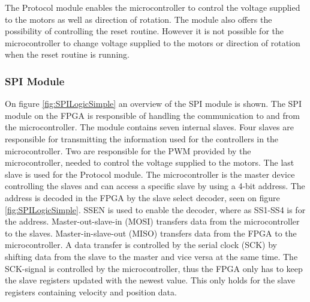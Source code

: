 \documentclass[../../main.tex]{subfiles}
\begin{document}
The Protocol module enables the microcontroller to control the voltage supplied to the motors as well as direction of rotation. The module also offers the possibility of controlling the reset routine. However it is not possible for the microcontroller to change voltage supplied to the motors or direction of rotation when the reset routine is running.  







\subsubsection*{SPI Module}

On figure \ref{fig:SPILogicSimple} an overview of the SPI module is shown. The SPI module on the FPGA is responsible of handling the communication to and from the microcontroller. The module contains seven internal slaves. Four slaves are responsible for transmitting the information used for the controllers in the microcontroller. Two are responsible for the PWM provided by the microcontroller, needed to control the voltage supplied to the motors. The last slave is used for the Protocol module. The microcontroller is the master device controlling the slaves and can access a specific slave by using a 4-bit address. The address is decoded in the FPGA by the slave select decoder, seen on figure \ref{fig:SPILogicSimple}. SSEN is used to enable the decoder, where as SS1-SS4 is for the address. Master-out-slave-in (MOSI) transfers data from the microcontroller to the slaves. Master-in-slave-out (MISO) transfers data from the FPGA to the microcontroller. A data transfer is controlled by the serial clock (SCK) by shifting data from the slave to the master and vice versa at the same time. The SCK-signal is controlled by the microcontroller, thus the FPGA only has to keep the slave registers updated with the newest value. This only holds for the slave registers containing velocity and position data. 
\end{document}
